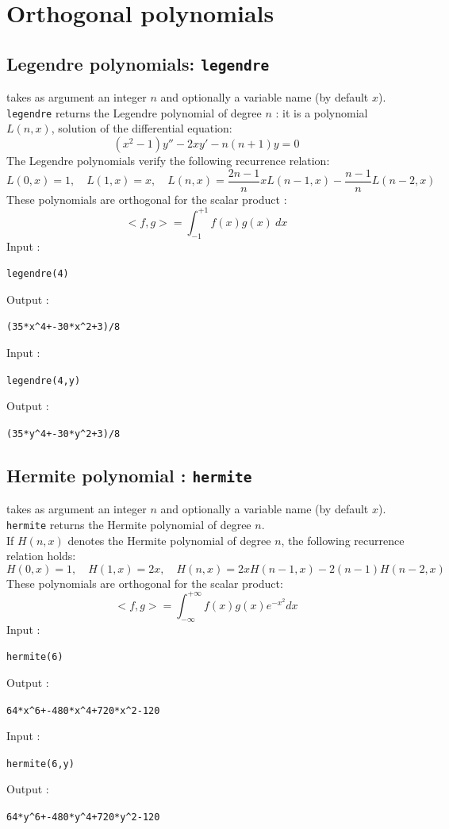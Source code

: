 \documentclass[a4paper,11pt]{book}
\begin{document}
\section{Orthogonal polynomials}
\subsection{Legendre polynomials: {\tt legendre}}
 takes as argument an integer $n$ and
optionally a variable name (by default $x$).\\
{\tt legendre} returns the Legendre polynomial of degree $n$ : it is
 a polynomial $L(n,x)$, solution of the differential equation:
$$(x^2-1) y''-2 x y'-n(n+1) y=0$$ 
The Legendre polynomials verify the following recurrence relation:
\[ L(0,x)=1, \quad 
L(1,x)=x, \quad
L(n,x)=\frac{2n-1}{n}x L(n-1,x)-\frac{n-1}{n}L(n-2,x)
\]
These polynomials are orthogonal for the scalar product :
\[ <f,g>=\int_{-1}^{+1}f(x)g(x)\ dx \]
Input :
\begin{center}{\tt legendre(4)}\end{center}
Output :
\begin{center}{\tt (35*x\verb|^|4+-30*x\verb|^|2+3)/8}\end{center}
Input :
\begin{center}{\tt legendre(4,y)}\end{center}
Output :
\begin{center}{\tt (35*y\verb|^|4+-30*y\verb|^|2+3)/8}\end{center}

\subsection{Hermite polynomial : {\tt hermite}}
 takes as argument an integer $n$ and
 optionally a variable name (by default $x$).\\
{\tt hermite} returns the Hermite polynomial of degree $n$.\\
If $H(n,x)$ denotes the Hermite polynomial of degree $n$,
the following recurrence relation holds:
\[  H(0,x)=1, \quad
H(1,x)=2x, \quad
H(n,x)=2xH(n-1,x)-2(n-1)H(n-2,x) \]
These polynomials are orthogonal for the scalar product:
\[ <f,g>=\int_{-\infty}^{+\infty}f(x)g(x)e^{-x^2}dx \]
Input :
\begin{center}{\tt hermite(6)}\end{center}
Output :
\begin{center}{\tt 64*x\verb|^|6+-480*x\verb|^|4+720*x\verb|^|2-120}\end{center}Input :
\begin{center}{\tt hermite(6,y)}\end{center}
Output :
\begin{center}{\tt 64*y\verb|^|6+-480*y\verb|^|4+720*y\verb|^|2-120}\end{center}
\end{document}
